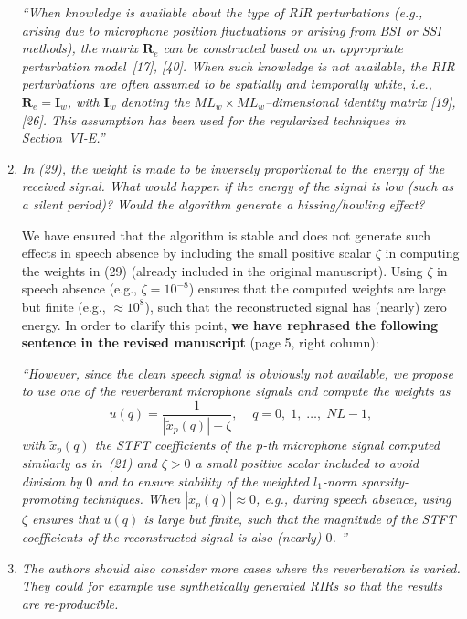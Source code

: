 \documentclass[9pt, a4paper]{article}
\begin{document}
\begin{enumerate}
{\emph{``When knowledge is available about the type of RIR perturbations (e.g., arising due to microphone position fluctuations or arising from BSI or SSI methods), the matrix $\mathbf{R}_e$ can be constructed based on an appropriate perturbation model~[17], [40].
    When such knowledge is not available, the RIR perturbations are often assumed to be spatially and temporally white, i.e., $\mathbf{R}_e = \mathbf{I}_w$, with $\mathbf{I}_w$ denoting the $ML_w \times ML_w$--dimensional identity matrix [19], [26].
    This assumption has been used for the regularized techniques in Section~VI-E.''
}}


\item {\textit{In (29), the weight is made to be inversely proportional to the energy of the received signal. What would happen if the energy of the signal is low (such as a silent period)? Would the algorithm generate a hissing/howling effect?}}

We have ensured that the algorithm is stable and does not generate such effects in speech absence by including the small positive scalar $\zeta$ in computing the weights in (29) (already included in the original manuscript).
Using $\zeta$ in speech absence (e.g., $\zeta = 10^{-8}$) ensures that the computed weights are large but finite (e.g., $\approx 10^{8}$), such that the reconstructed signal has (nearly) zero energy.
In order to clarify this point, {\bf{we have rephrased the following sentence in the revised manuscript}} (page 5, right column):

{\emph{``However, since the clean speech signal is obviously not available, we propose to use one of the reverberant microphone signals and compute the weights as
\begin{equation*}
\label{eq: weights}
u(q) = \frac{1}{|\tilde{x}_p(q)| + \zeta}, \; \; \; \; q = 0, \; 1, \; \ldots, \; NL-1,
\end{equation*}
with $\tilde{x}_p(q)$ the STFT coefficients of the $p$-th microphone signal computed similarly as in~(21) and $\zeta > 0$ a small positive scalar included to avoid division by $0$ and to ensure stability of the weighted $l_1$-norm sparsity-promoting techniques.
When $|\tilde{x}_p(q)| \approx 0$, e.g., during speech absence, using $\zeta$ ensures that $u(q)$ is large but finite, such that the magnitude of the STFT coefficients of the reconstructed signal is also (nearly) $0$.
''
}}

\item {\textit{The authors should also consider more cases where the reverberation is varied. They could for example use synthetically generated RIRs so that the results are re-producible.}}


\end{enumerate}
\end{document}
